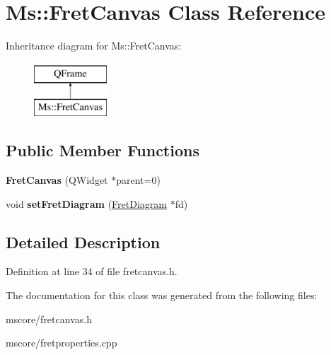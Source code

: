 \hypertarget{class_ms_1_1_fret_canvas}{}\section{Ms\+:\+:Fret\+Canvas Class Reference}
\label{class_ms_1_1_fret_canvas}
Inheritance diagram for Ms\+:\+:Fret\+Canvas\+:\begin{figure}[H]
\begin{center}
\leavevmode
\includegraphics[height=2.000000cm]{class_ms_1_1_fret_canvas}
\end{center}
\end{figure}
\subsection*{Public Member Functions}
\begin{DoxyCompactItemize}
\item 
\mbox{\label{class_ms_1_1_fret_canvas_aa4772182bbd04511625b87533f59a67a}} 
{\bfseries Fret\+Canvas} (Q\+Widget $\ast$parent=0)
\item 
\mbox{\label{class_ms_1_1_fret_canvas_aabb28709864d60936b75ed265738b7dd}} 
void {\bfseries set\+Fret\+Diagram} (\hyperlink{class_ms_1_1_fret_diagram}{Fret\+Diagram} $\ast$fd)
\end{DoxyCompactItemize}


\subsection{Detailed Description}


Definition at line 34 of file fretcanvas.\+h.



The documentation for this class was generated from the following files\+:\begin{DoxyCompactItemize}
\item 
mscore/fretcanvas.\+h\item 
mscore/fretproperties.\+cpp\end{DoxyCompactItemize}
